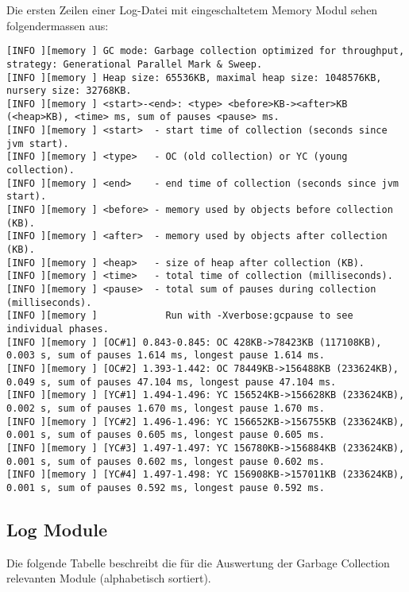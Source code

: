 \begin{landscape}\label{logexample}
Die ersten Zeilen einer Log-Datei mit eingeschaltetem Memory Modul sehen folgendermassen aus:
\begin{lstlisting}[caption=Garbage Collection Log]
[INFO ][memory ] GC mode: Garbage collection optimized for throughput, strategy: Generational Parallel Mark & Sweep.
[INFO ][memory ] Heap size: 65536KB, maximal heap size: 1048576KB, nursery size: 32768KB.
[INFO ][memory ] <start>-<end>: <type> <before>KB-><after>KB (<heap>KB), <time> ms, sum of pauses <pause> ms.
[INFO ][memory ] <start>  - start time of collection (seconds since jvm start).
[INFO ][memory ] <type>   - OC (old collection) or YC (young collection).
[INFO ][memory ] <end>    - end time of collection (seconds since jvm start).
[INFO ][memory ] <before> - memory used by objects before collection (KB).
[INFO ][memory ] <after>  - memory used by objects after collection (KB).
[INFO ][memory ] <heap>   - size of heap after collection (KB).
[INFO ][memory ] <time>   - total time of collection (milliseconds).
[INFO ][memory ] <pause>  - total sum of pauses during collection (milliseconds).
[INFO ][memory ]            Run with -Xverbose:gcpause to see individual phases.
[INFO ][memory ] [OC#1] 0.843-0.845: OC 428KB->78423KB (117108KB), 0.003 s, sum of pauses 1.614 ms, longest pause 1.614 ms.
[INFO ][memory ] [OC#2] 1.393-1.442: OC 78449KB->156488KB (233624KB), 0.049 s, sum of pauses 47.104 ms, longest pause 47.104 ms.
[INFO ][memory ] [YC#1] 1.494-1.496: YC 156524KB->156628KB (233624KB), 0.002 s, sum of pauses 1.670 ms, longest pause 1.670 ms.
[INFO ][memory ] [YC#2] 1.496-1.496: YC 156652KB->156755KB (233624KB), 0.001 s, sum of pauses 0.605 ms, longest pause 0.605 ms.
[INFO ][memory ] [YC#3] 1.497-1.497: YC 156780KB->156884KB (233624KB), 0.001 s, sum of pauses 0.602 ms, longest pause 0.602 ms.
[INFO ][memory ] [YC#4] 1.497-1.498: YC 156908KB->157011KB (233624KB), 0.001 s, sum of pauses 0.592 ms, longest pause 0.592 ms.
\end{lstlisting}
\end{landscape}

\subsection{Log Module}\label{logmodule}

Die folgende Tabelle beschreibt die für die Auswertung der Garbage Collection relevanten Module (alphabetisch sortiert). 

